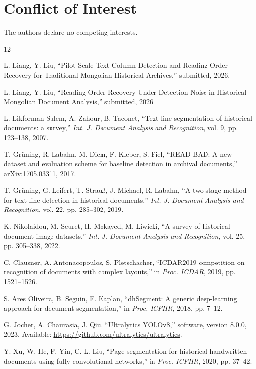 \documentclass[pdflatex,sn-mathphys-num]{sn-jnl}
\begin{document}
\section*{Conflict of Interest}
The authors declare no competing interests.

\begin{thebibliography}{12}

L. Liang, Y. Liu, ``Pilot-Scale Text Column Detection and Reading-Order Recovery for Traditional Mongolian Historical Archives,'' submitted, 2026.

L. Liang, Y. Liu, ``Reading-Order Recovery Under Detection Noise in Historical Mongolian Document Analysis,'' submitted, 2026.

L. Likforman-Sulem, A. Zahour, B. Taconet, ``Text line segmentation of historical documents: a survey,'' \emph{Int. J. Document Analysis and Recognition}, vol. 9, pp. 123--138, 2007.

T. Gr\"uning, R. Labahn, M. Diem, F. Kleber, S. Fiel, ``READ-BAD: A new dataset and evaluation scheme for baseline detection in archival documents,'' arXiv:1705.03311, 2017.

T. Gr\"uning, G. Leifert, T. Strau\ss{}, J. Michael, R. Labahn, ``A two-stage method for text line detection in historical documents,'' \emph{Int. J. Document Analysis and Recognition}, vol. 22, pp. 285--302, 2019.

K. Nikolaidou, M. Seuret, H. Mokayed, M. Liwicki, ``A survey of historical document image datasets,'' \emph{Int. J. Document Analysis and Recognition}, vol. 25, pp. 305--338, 2022.

C. Clausner, A. Antonacopoulos, S. Pletschacher, ``ICDAR2019 competition on recognition of documents with complex layouts,'' in \emph{Proc. ICDAR}, 2019, pp. 1521--1526.

S. Ares Oliveira, B. Seguin, F. Kaplan, ``dhSegment: A generic deep-learning approach for document segmentation,'' in \emph{Proc. ICFHR}, 2018, pp. 7--12.

G. Jocher, A. Chaurasia, J. Qiu, ``Ultralytics YOLOv8,'' software, version 8.0.0, 2023. Available: \url{https://github.com/ultralytics/ultralytics}.

Y. Xu, W. He, F. Yin, C.-L. Liu, ``Page segmentation for historical handwritten documents using fully convolutional networks,'' in \emph{Proc. ICFHR}, 2020, pp. 37--42.


\end{thebibliography}
\end{document}
